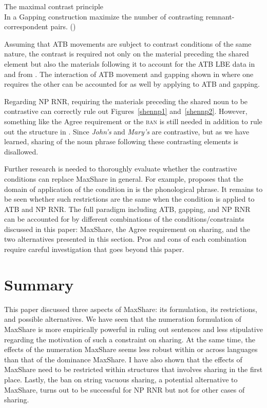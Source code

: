\documentclass[output=paper]{langscibook}
\begin{document}
\ea 
	\label{shenMCP}
	The maximal contrast principle\\
	In a Gapping construction maximize the number of contrasting remnant-correspondent pairs. (\citealt[p. 165, 43]{Hartmann:2000})
	\z 


Assuming that ATB movements are subject to contrast conditions of the same nature, the contrast is required not only on the material preceding the shared element but also the materials following it to account for the ATB LBE data in  and  from \citet{Citko:2006}. The interaction of ATB movement and gapping shown in  where one requires the other can be accounted for as well by applying  to ATB and gapping. 

Regarding NP RNR, requiring the materials preceding the shared noun to be contrastive can correctly rule out Figures~\ref{shennp1} and~\ref{shennp2}. However, something like the Agree requirement or the \textsc{ban} is still needed in addition to rule out the structure in . Since \textit{John's} and \textit{Mary's} are contrastive, but as we have learned, sharing of the noun phrase following these contrasting elements is disallowed. 

Further research is needed to thoroughly evaluate whether the contrastive conditions can replace MaxShare in general. For example, \citet{Hartmann:2000} proposes that the domain of application of the condition in  is the phonological phrase. It remains to be seen whether such restrictions are the same when the condition is applied to ATB and NP RNR.  The full paradigm including ATB, gapping, and NP RNR can be accounted for by different combinations of the conditions/constraints discussed in this paper: MaxShare, the Agree requirement on sharing, and the two alternatives presented in this section. Pros and cons of each combination require careful investigation that goes beyond this paper.

\section{Summary}
\label{shensect:summary}

This paper discussed three aspects of MaxShare: its formulation, its restrictions, and possible alternatives. We have seen that the numeration formulation of MaxShare is more empirically powerful in ruling out sentences and less stipulative regarding the motivation of such a constraint on sharing. At the same time, the effects of the numeration MaxShare seems less robust within or across languages than that of the dominance MaxShare. I have also shown that the effects of MaxShare need to be restricted within structures that involves sharing in the first place. Lastly, the ban on string vacuous sharing, a potential alternative to MaxShare, turns out to be successful for NP RNR but not for other cases of sharing. 
\end{document}
